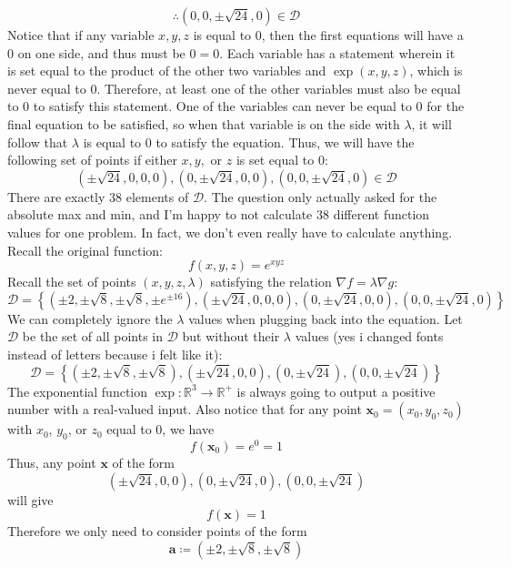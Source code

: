 \documentclass[12pt, letterpaper]{report}
\begin{document}
    \[
        \therefore \left(0,0,\pm\sqrt{24},0 \right)\in \mathcal{D}
    \]
Notice that if any variable \(x,y,z\) is equal to \(0\), then the first equations will have a \(0\) on one side, and thus must be \(0=0\). Each variable has a statement wherein it is set equal to the product of the other two variables and \(\exp (x,y,z)\), which is never equal to \(0\). Therefore, at least one of the other variables must also be equal to \(0\) to satisfy this statement. One of the variables can never be equal to \(0\) for the final equation to be satisfied, so when that variable is on the side with \(\lambda \), it will follow that \(\lambda \) is equal to \(0\) to satisfy the equation. Thus, we will have the following set of points if either \(x,y,\) or \(z\) is set equal to \(0\):
\[
    \left( \pm\sqrt{24},0,0,0  \right),\left( 0,\pm\sqrt{24},0,0  \right),\left( 0,0,\pm\sqrt{24},0  \right)\in \mathcal{D} 
\]
There are exactly 38 elements of \(\mathcal{D} \). The question only actually asked for the absolute max and min, and I'm happy to not calculate 38 different function values for one problem. In fact, we don't even really have to calculate anything. Recall the original function:
\[
    f(x,y,z)=e^{xyz} 
\]
Recall the set of points \((x,y,z,\lambda )\) satisfying the relation \(\nabla f=\lambda \nabla g\):
\[
    \mathcal{D} =\left\{ \left( \pm 2,\pm\sqrt{8},\pm\sqrt{8},\pm e^{\pm 16}   \right),\left( \pm\sqrt{24},0,0,0  \right),\left( 0,\pm\sqrt{24},0,0  \right),\left( 0,0,\pm\sqrt{24},0  \right)  \right\} 
\]
We can completely ignore the \(\lambda \) values when plugging back into the equation. Let \(\mathscr{D} \) be the set of all points in \(\mathcal{D} \) but without their \(\lambda \) values (yes i changed fonts instead of letters because i felt like it):
\[
    \mathscr{D} =\left\{ \left( \pm 2,\pm\sqrt{8},\pm\sqrt{8}   \right),\left( \pm\sqrt{24},0,0  \right),\left( 0,\pm\sqrt{24}  \right),\left( 0,0,\pm\sqrt{24}  \right)  \right\} 
\]
The exponential function \(\exp :\mathbb{R} ^3\to \mathbb{R}^+ \) is always going to output a positive number with a real-valued input. Also notice that for any point \(\mathbf{x} _0=\left( x_0,y_0,z_0 \right) \)  with \(x_0\), \(y_0\), or \(z_0\) equal to 0, we have
\[
    f \left( \mathbf{x} _0 \right) =e^{0}=1 
\]
Thus, any point \(\mathbf{x}  \)  of the form 
\[
    \left( \pm\sqrt{24},0,0  \right),\left( 0,\pm\sqrt{24},0 \right),\left( 0,0,\pm\sqrt{24}  \right)
\]
will give
\[
    f(\mathbf{x} )=1
\]
Therefore we only need to consider points of the form 
\[\mathbf{a }\coloneqq   \left( \pm 2,\pm\sqrt{8},\pm\sqrt{8}   \right)\]
\end{document}
